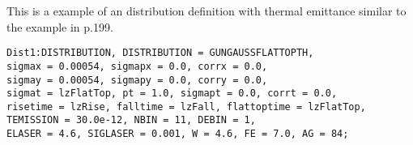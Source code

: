 This is a example of an \opal distribution definition with thermal emittance similar to the example in \cite{clen:2000} p.199.

\begin{verbatim}
Dist1:DISTRIBUTION, DISTRIBUTION = GUNGAUSSFLATTOPTH,
sigmax = 0.00054, sigmapx = 0.0, corrx = 0.0,
sigmay = 0.00054, sigmapy = 0.0, corry = 0.0,
sigmat = lzFlatTop, pt = 1.0, sigmapt = 0.0, corrt = 0.0,
risetime = lzRise, falltime = lzFall, flattoptime = lzFlatTop,
TEMISSION = 30.0e-12, NBIN = 11, DEBIN = 1,
ELASER = 4.6, SIGLASER = 0.001, W = 4.6, FE = 7.0, AG = 84;  

\end{verbatim}





